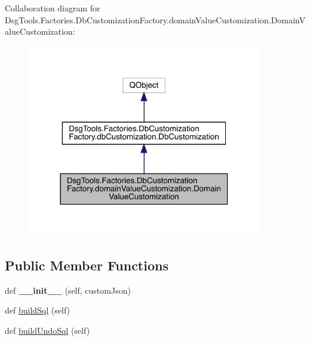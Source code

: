 Collaboration diagram for Dsg\+Tools.\+Factories.\+Db\+Customization\+Factory.\+domain\+Value\+Customization.\+Domain\+Value\+Customization\+:
\nopagebreak
\begin{figure}[H]
\begin{center}
\leavevmode
\includegraphics[width=290pt]{class_dsg_tools_1_1_factories_1_1_db_customization_factory_1_1domain_value_customization_1_1_dom2ee96c4f388af8a8f7f484442944758a}
\end{center}
\end{figure}
\subsection*{Public Member Functions}
\begin{DoxyCompactItemize}
\item 
\mbox{\label{class_dsg_tools_1_1_factories_1_1_db_customization_factory_1_1domain_value_customization_1_1_domain_value_customization_a8c7f0b740719eaee9d7aa75704bc6bca}} 
def {\bfseries \+\_\+\+\_\+init\+\_\+\+\_\+} (self, custom\+Json)
\item 
def \mbox{\hyperlink{class_dsg_tools_1_1_factories_1_1_db_customization_factory_1_1domain_value_customization_1_1_domain_value_customization_ac7e6e73a0d0e732e672895247dd179d6}{build\+Sql}} (self)
\item 
def \mbox{\hyperlink{class_dsg_tools_1_1_factories_1_1_db_customization_factory_1_1domain_value_customization_1_1_domain_value_customization_ab39a3a641b7015ef27c7eebf4270557e}{build\+Undo\+Sql}} (self)
\end{DoxyCompactItemize}
